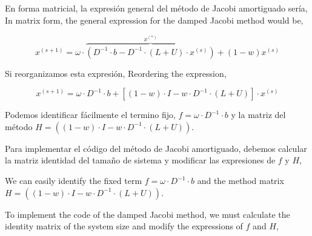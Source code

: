 \begin{paracol}{2}

En forma matricial, la expresión general del método de Jacobi amortiguado sería,
\switchcolumn
In matrix form, the general expression for the damped Jacobi method would be,
\end{paracol}
\begin{equation*}
x^{(s+1)}=\omega\cdot\overbrace{\left(D^{-1}\cdot b- D^{-1}\cdot\left(L+U\right)\cdot x^{(s)}\right)}^{x^{(*)}}+(1-w)x^{(s)}
\end{equation*}

\begin{paracol}
Si reorganizamos esta expresión,
\switchcolumn
Reordering the expression,
\end{paracol}


\begin{equation*}
x^{(s+1)}=\omega\cdot D^{-1}\cdot b+ \left[(1-w)\cdot I - w\cdot  D^{-1}\cdot  \left(L+U \right)\right]\cdot x^{(s)}
\end{equation*}

\begin{paracol}{2}
Podemos identificar fácilmente el termino fijo, $f=\omega\cdot D^{-1}\cdot b$ y la matriz del método $H=\left((1-w)\cdot I - w\cdot  D^{-1}\cdot  \left(L+U \right)\right)$.

Para implementar el código del método de Jacobi amortiguado, debemos calcular la matriz identidad del tamaño de sistema y modificar las expresiones de $f$ y $H$,

\switchcolumn
We can easily identify the fixed term  $f=\omega\cdot D^{-1}\cdot b$ and the method matrix $H=\left((1-w)\cdot I - w\cdot  D^{-1}\cdot  \left(L+U \right)\right)$.

To implement the code of the damped Jacobi method, we must calculate the identity matrix of the system size and modify the expressions of $f$ and $H$,

\end{paracol}

